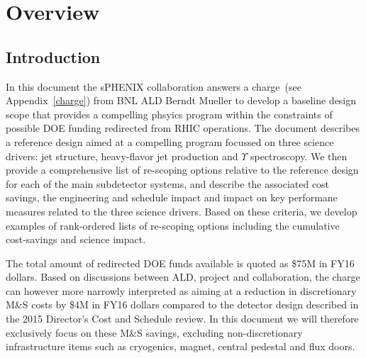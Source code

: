 \chapter*{Overview}
\label{configurations}
\setcounter{page}{1}

\section{Introduction}
In this document the sPHENIX collaboration answers a charge~(see
Appendix~\ref{charge}) from BNL ALD Berndt Mueller to develop
a baseline design scope that provides a compelling phsyics program
within the constraints of possible DOE funding redirected from 
RHIC operations. The document describes a reference design aimed
at a compelling program focussed on three science drivers: jet structure,
heavy-flavor jet production and $\Upsilon$ spectroscopy. We then
provide a comprehensive list of re-scoping options relative 
to the reference design for each
of the main subdetector systems, and describe the associated
cost savings, the engineering and schedule impact and impact on 
key performane measures related to the three science 
drivers. Based on these criteria, we develop examples of 
rank-ordered lists of re-scoping options including the 
cumulative cost-savings and science impact.

The total amount of redirected DOE funds available is quoted as \$75M in FY16 dollars.
Based on discussions between ALD, project and collaboration, the charge can
however more narrowly interpreted as aiming at a reduction in discretionary M\&S costs 
by \$4M in FY16 dollars compared to the detector design described
in the 2015 Director's Cost and Schedule review. In this document we will
therefore exclusively focus on these M\&S savings, excluding non-discretionary 
infrastructure items such as cryogenics, magnet, central pedestal and flux doors.

